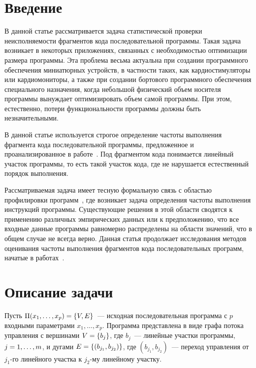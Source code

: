       \begin{multicols}{2}

            \label{st\stat}

\section{Введение}

В данной статье рассматривается задача статистической проверки
неисполняемости фрагментов кода последовательной программы. Такая
задача возникает в некоторых приложениях, связанных с необходимостью
оптимизации размера программы. Эта проблема весьма актуальна при
создании программного обеспечения миниатюрных устройств, в частности
таких, как кардиостимуляторы или кардиомониторы, а также при
создании бортового программного обеспечения специального назначения,
когда небольшой физический объем носителя программы вынуждает
оптимизировать объем самой программы. При этом, естественно, потери
функциональности программы должны быть незначительными.

В данной статье используется строгое определение частоты выполнения
фрагмента кода последовательной программы, предложенное и
проанализированное в работе~\cite{Shalimov2010}. Под фрагментом кода
понимается линейный участок программы, то есть такой участок кода,
где не нарушается естественный порядок выполнения.

Рассматриваемая задача имеет тесную формальную связь с областью
профилировки программ~\cite{YoufengLarus1994, BallLarus1994}, где
возникает задача определения час\-то\-ты выполнения инструкций
программы. Существующие решения в этой области сводятся к применению
различных эмпирических данных или к предположению, что все входные
данные программы равномерно распределены на области значений, что в
общем случае не всегда верно. Данная \mbox{статья} продолжает исследования
методов оценивания частоты выполнения фрагментов кода
последовательных программ, начатые в работах~\cite{Shalimov2010, KSSS2012}.

\section{Описание задачи}

Пусть $\Pi(x_1,\ldots,x_p)\hm=\{V,E\}$~--- исходная последовательная
программа с $p$ входными параметрами $x_1,\ldots,x_p$. Программа
представлена в виде графа потока управления с вершинами $V\hm=\{b_j\}$,
где $b_j$~--- линейные участки программы, $j\hm=1,\ldots,m$, и дугами
$E\hm=\{(b_{j_1},b_{j_2})\}$, где $(b_{j_1},b_{j_2})$~--- переход
управления от $j_1$-го линейного участка к $j_2$-му линейному
участку.


\end{multicols}
